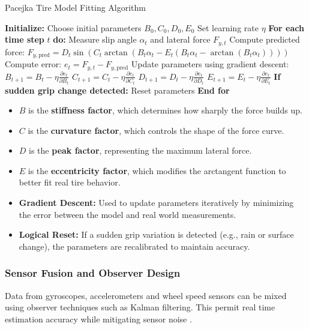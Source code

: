 \documentclass[a4paper,final,12pt]{report}
\begin{document}
\newpage
\begin{algorithm}
\caption{Pacejka Tire Model Fitting Algorithm}
\begin{algorithmic}[1]
\STATE \textbf{Initialize:}
\STATE Choose initial parameters $B_0, C_0, D_0, E_0$
\STATE Set learning rate $\eta$
\STATE \textbf{For each time step} $t$ \textbf{do:}
\STATE \quad Measure slip angle $\alpha_t$ and lateral force $F_{y,t}$
\STATE \quad Compute predicted force:
\STATE \quad $F_{y,\text{pred}} = D_t \sin(C_t \arctan(B_t \alpha_t - E_t (B_t \alpha_t - \arctan(B_t \alpha_t))))$
\STATE \quad Compute error: $e_t = F_{y,t} - F_{y,\text{pred}}$
\STATE \quad Update parameters using gradient descent:
\STATE \quad $B_{t+1} = B_t - \eta \frac{\partial e_t}{\partial B_t}$
\STATE \quad $C_{t+1} = C_t - \eta \frac{\partial e_t}{\partial C_t}$
\STATE \quad $D_{t+1} = D_t - \eta \frac{\partial e_t}{\partial D_t}$
\STATE \quad $E_{t+1} = E_t - \eta \frac{\partial e_t}{\partial E_t}$
\STATE \quad \textbf{If sudden grip change detected:} Reset parameters
\STATE \textbf{End for}
\end{algorithmic}
\end{algorithm}

\begin{itemize}
    \item $B$ is the \textbf{stiffness factor}, which determines how sharply the force builds up.
    \item $C$ is the \textbf{curvature factor}, which controls the shape of the force curve.
    \item $D$ is the \textbf{peak factor}, representing the maximum lateral force.
    \item $E$ is the \textbf{eccentricity factor}, which modifies the arctangent function to better fit real tire behavior.
    \item \textbf{Gradient Descent:} Used to update parameters iteratively by minimizing the error between the model and real world measurements.
    \item \textbf{Logical Reset:} If a sudden grip variation is detected (e.g., rain or surface change), the parameters are recalibrated to maintain accuracy.
\end{itemize}


\subsubsection{Sensor Fusion and Observer Design}
Data from gyroscopes, accelerometers and wheel speed sensors can be mixed using observer techniques such as Kalman filtering. This permit real time estimation accuracy while mitigating sensor noise \cite{Gao2012}.
\end{document}
